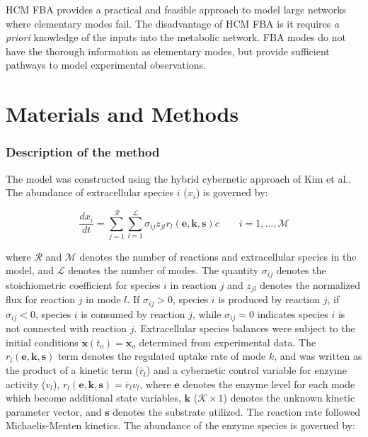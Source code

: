 \documentclass[10pt,twocolumn,twoside,final]{IEEEtran}
\begin{document}
HCM FBA provides a practical and feasible approach to model large networks where elementary modes fail.
The disadvantage of HCM FBA is it requires \textit{a priori} knowledge of the inputs into the metabolic network.
FBA modes do not have the thorough information as elementary modes, but provide sufficient pathways to model experimental observations.

\section{Materials and Methods}

\noindent\subsubsection*{Description of the method}
The model was constructed using the hybrid cybernetic approach of Kim et al.\cite{2008_kim_varner_ramkrishna_BiotechProg}. 
The abundance of extracellular species $i$ ($x_{i}$) is governed by:

\begin{equation}
	\frac{dx_{i}}{dt}  =  \sum_{j = 1}^{\mathcal{R}}\sum_{l = 1}^{\mathcal{L}}\sigma_{ij}z_{jl}r_{l}\left(\mathbf{e},\mathbf{k},\mathbf{s}\right)c \qquad{i=1,\hdots,\mathcal{M}} 
\end{equation}

where $\mathcal{R}$ and $\mathcal{M}$ denotes the number of reactions and extracellular species in the model, and $\mathcal{L}$ denotes the number of modes.
The quantity $\sigma_{ij}$ denotes the stoichiometric coefficient for species $i$ in reaction $j$ and
$z_{jl}$ denotes the normalized flux for reaction $j$ in mode $l$.
If $\sigma_{ij}>0$, species $i$ is produced by reaction $j$, if $\sigma_{ij}<0$, species $i$ is consumed by reaction $j$, while $\sigma_{ij} = 0$ indicates species $i$ is not connected with reaction $j$.
Extracellular species balances were subject to the initial conditions $\mathbf{x}\left(t_{o}\right) = \mathbf{x}_{o}$ determined from experimental data.
The $r_{l}\left(\mathbf{e},\mathbf{k},\mathbf{s}\right)$ term denotes the regulated uptake rate of mode $k$, and was written as the product of a kinetic term ($\bar{r}_{l}$) and a cybernetic control variable for enzyme activity ($v_{l}$), $r_{l}\left(\mathbf{e},\mathbf{k},\mathbf{s}\right) = \bar{r}_{l}v_{l}$, where $\mathbf{e}$ denotes the enzyme level for each mode which become additional state variables, $\mathbf{k}$ ($\mathcal{K}\times{1}$) denotes the unknown kinetic parameter vector, and $\mathbf{s}$ denotes the substrate utilized. The reaction rate followed Michaelis-Menten kinetics. The abundance of the enzyme species is governed by:
 
\end{document}
